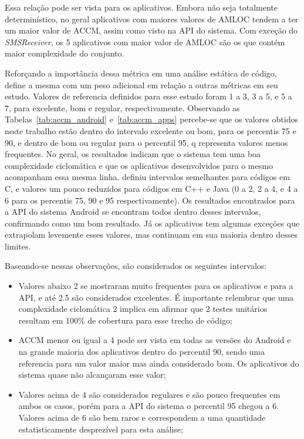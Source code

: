 Essa relação pode ser vista para os aplicativos. Embora não seja totalmente determinístico, no geral aplicativos com maiores valores de AMLOC tendem a ter um maior valor de ACCM, assim como visto na API do sistema. Com exceção do \textit{SMSReceiver}, os 5 aplicativos com maior valor de AMLOC são os que contém maior complexidade do conjunto. 

Reforçando a importância dessa métrica em uma análise estática de código,  define a mesma com um peso adicional em relação a outras métricas em seu estudo. Valores de referencia definidos para esse estudo foram 1 a 3, 3 a 5, e 5 a 7, para excelente, bom e regular, respectivamente. Observando as Tabelas~\ref{tab:accm_android} e~\ref{tab:accm_apps} percebe-se que os valores obtidos neste trabalho estão dentro do intervalo excelente ou bom, para os percentis 75 e 90, e dentro de bom ou regular para o percentil 95, q representa valores menos frequentes. No geral, os resultados indicam que o sistema tem uma boa complexidade ciclomática e que os aplicativos desenvolvidos para o mesmo acompanham essa mesma linha.  definiu intervalos semelhantes para códigos em C, e valores um pouco reduzidos para códigos em C++ e Java (0 a 2, 2 a 4, e 4 a 6 para os percentis 75, 90 e 95 respectivamente).  Os resultados encontrados para a API do sistema Android se encontram todos dentro desses intervalos, confirmando como um bom resultado. Já os aplicativos tem algumas exceções que extrapolam levemente esses valores, mas continuam em sua maioria dentro desses limites.

Baseando-se nessas observações, são considerados os seguintes intervalos:

\begin{itemize}
\item Valores abaixo 2 se mostraram muito frequentes para os aplicativos e para a API, e até 2.5 são considerados excelentes. É importante relembrar que uma complexidade ciclomática 2 implica em afirmar que 2 testes unitários resultam em 100\% de cobertura para esse trecho de código;
\item ACCM menor ou igual a 4 pode ser vista em todas as versões do Android e na grande maioria dos aplicativos dentro do percentil 90, sendo uma referencia para um valor maior mas ainda considerado bom. Os aplicativos do sistema quase não alcançaram esse valor;
\item Valores acima de 4 são considerados regulares e são pouco frequentes em ambos os casos, porém para a API do sistema o percentil 95 chegou a 6. Valores acima de 6 são bem raros e correspondem a uma quantidade estatisticamente desprezível para esta análise;
\end{itemize}

